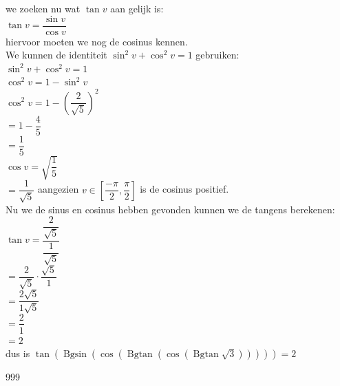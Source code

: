 \documentclass[a4paper]{article}
\newcommand{\Bgsin}{\operatorname{Bgsin}}
\newcommand{\Bgtan}{\operatorname{Bgtan}}
\begin{document}
we zoeken nu wat $\tan v$ aan gelijk is: \\

$\tan v = \dfrac{\sin v}{\cos v}$ \\

hiervoor moeten we nog de cosinus kennen. \\ 

We kunnen de identiteit $\sin^2 v + \cos^2 v = 1$ gebruiken: \\

$\sin^2 v + \cos^2 v = 1$ \\

$\cos^2 v = 1 - \sin^2 v$ \\

$\cos^2 v = 1 - \left(\dfrac{2}{\sqrt{5}}\right)^2$ \\

$= 1 - \dfrac{4}{5}$ \\

$= \dfrac{1}{5}$ \\

$\cos v = \sqrt{\dfrac{1}{5}}$ \\

$= \dfrac{1}{\sqrt{5}}$ aangezien $v \in \left[\dfrac{-\pi}{2}, \dfrac{\pi}{2}\right]$ is de cosinus positief.\\

Nu we de sinus en cosinus hebben gevonden kunnen we de tangens berekenen: \\

$\tan v = \dfrac{\dfrac{2}{\sqrt{5}}}{\dfrac{1}{\sqrt{5}}}$ \\

$= \dfrac{2}{\sqrt{5}} \cdot \dfrac{\sqrt{5}}{1}$ \\

$= \dfrac{2\sqrt{5}}{1\sqrt{5}}$ \\

$= \dfrac{2}{1}$ \\

$= 2$ \\

dus is $\tan\left(\Bgsin\left(\cos\left(\Bgtan\left(\cos\left(\Bgtan\sqrt{3}\right)\right)\right)\right)\right) = 2$ 

\begin{thebibliography}{999}
\end{thebibliography}
\end{document}
